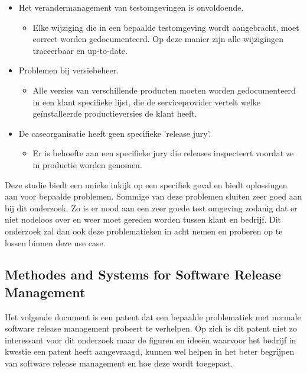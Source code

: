 \begin{itemize}
\begin{itemize}
    \end{itemize}
    \item Het verandermanagement van testomgevingen is onvoldoende.
    \begin{itemize}
        \item Elke wijziging die in een bepaalde testomgeving wordt aangebracht, moet correct worden gedocumenteerd. Op deze manier zijn alle wijzigingen traceerbaar en up-to-date.
    \end{itemize}
    \item Problemen bij versiebeheer.
    \begin{itemize}
        \item Alle versies van verschillende producten moeten worden gedocumenteerd in een klant specifieke lijst, die de serviceprovider vertelt welke geïnstalleerde productieversies de klant heeft.
    \end{itemize}
    \item De caseorganisatie heeft geen specifieke 'release jury'.
    \begin{itemize}
        \item Er is behoefte aan een specifieke jury die releases inspecteert voordat ze in productie worden genomen.
    \end{itemize}
\end{itemize}
Deze studie \autocite{Lahtela2011} biedt een unieke inkijk op een specifiek geval en biedt oplossingen aan voor bepaalde problemen. Sommige van deze problemen sluiten zeer goed aan bij dit onderzoek. Zo is er nood aan een zeer goede test omgeving zodanig dat er niet nodeloos over en weer moet gereden worden tussen klant en bedrijf. Dit onderzoek zal dan ook deze problematieken in acht nemen en proberen op te lossen binnen deze use case.

\subsection{Methodes and Systems for Software Release Management}
Het volgende document \autocite{Barshefsky2005} is een patent dat een bepaalde problematiek met normale software release management probeert te verhelpen. Op zich is dit patent niet zo interessant voor dit onderzoek maar de figuren en ideeën waarvoor het bedrijf in kwestie een patent heeft aangevraagd, kunnen wel helpen in het beter begrijpen van software release management en hoe deze wordt toegepast.

